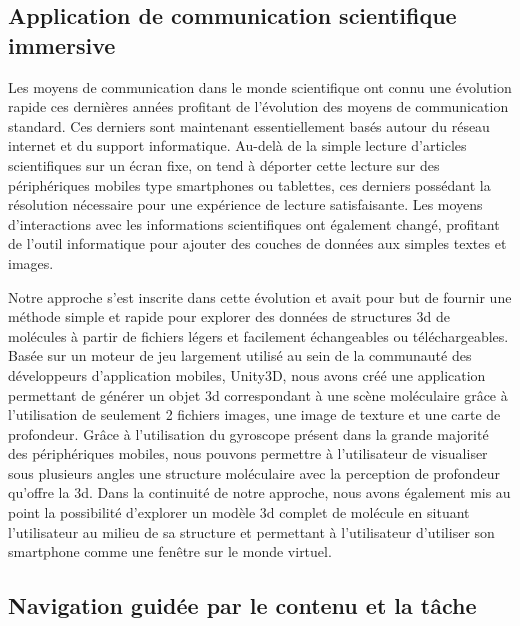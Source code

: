 \subsection*{Application de communication scientifique immersive}

Les moyens de communication dans le monde scientifique ont connu une évolution rapide ces dernières années profitant de l'évolution des moyens de communication standard. Ces derniers sont maintenant essentiellement basés autour du réseau internet et du support informatique. Au-delà de la simple lecture d'articles scientifiques sur un écran fixe, on tend à déporter cette lecture sur des périphériques mobiles type smartphones ou tablettes, ces derniers possédant la résolution nécessaire pour une expérience de lecture satisfaisante. Les moyens d'interactions avec les informations scientifiques ont également changé, profitant de l'outil informatique pour ajouter des couches de données aux simples textes et images.

Notre approche s'est inscrite dans cette évolution et avait pour but de fournir une méthode simple et rapide pour explorer des données de structures 3d de molécules à partir de fichiers légers et facilement échangeables ou téléchargeables. Basée sur un moteur de jeu largement utilisé au sein de la communauté des développeurs d'application mobiles, Unity3D, nous avons créé une application permettant de générer un objet 3d correspondant à une scène moléculaire grâce à l'utilisation de seulement 2 fichiers images, une image de texture et une carte de profondeur. Grâce à l'utilisation du gyroscope présent dans la grande majorité des périphériques mobiles, nous pouvons permettre à l'utilisateur de visualiser sous plusieurs angles une structure moléculaire avec la perception de profondeur qu'offre la 3d.
Dans la continuité de notre approche, nous avons également mis au point la possibilité d'explorer un modèle 3d complet de molécule en situant l'utilisateur au milieu de sa structure et permettant à l'utilisateur d'utiliser son smartphone comme une fenêtre sur le monde virtuel.

\subsection*{Navigation guidée par le contenu et la tâche}

